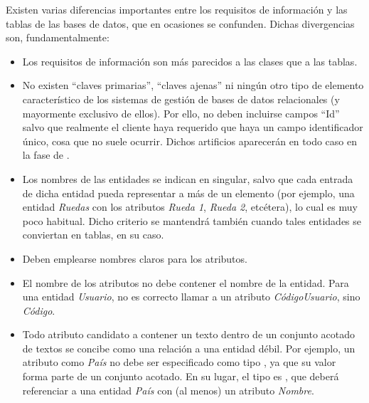 \begin{shaded}
Existen varias diferencias importantes entre los requisitos de información y las tablas de las bases de datos, que en ocasiones se confunden. Dichas divergencias son, fundamentalmente:
\begin{itemize}
    \item Los requisitos de información son más parecidos a las clases que a las tablas.
    \item No existen ``claves primarias'', ``claves ajenas'' ni ningún otro tipo de elemento característico de los sistemas de gestión de bases de datos relacionales (y mayormente exclusivo de ellos). Por ello, no deben incluirse campos ``Id'' salvo que realmente el cliente haya requerido que haya un campo identificador único, cosa que no suele ocurrir. Dichos artificios aparecerán en todo caso en la fase de .
    \item Los nombres de las entidades se indican en singular, salvo que cada entrada de dicha entidad pueda representar a más de un elemento (por ejemplo, una entidad \textit{Ruedas} con los atributos \textit{Rueda 1}, \textit{Rueda 2}, etcétera), lo cual es muy poco habitual. Dicho criterio se mantendrá también cuando tales entidades se conviertan en tablas, en su caso.
    \item Deben emplearse nombres claros para los atributos.
    \item El nombre de los atributos no debe contener el nombre de la entidad. Para una entidad \textit{Usuario}, no es correcto llamar a un atributo \textit{CódigoUsuario}, sino \textit{Código}.
    \item Todo atributo candidato a contener un texto dentro de un conjunto acotado de textos se concibe como una relación a una entidad débil. Por ejemplo, un atributo como \textit{País} no debe ser especificado como tipo , ya que su valor forma parte de un conjunto acotado. En su lugar, el tipo es , que deberá referenciar a una entidad \textit{País} con (al menos) un atributo \textit{Nombre}.
\end{itemize}
\end{shaded}

